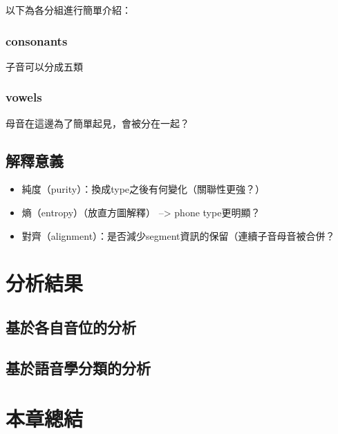 以下為各分組進行簡單介紹：

\subsubsection{consonants}

子音可以分成五類

\subsubsection{vowels}

母音在這邊為了簡單起見，會被分在一起？

\subsection{解釋意義}

\begin{itemize}
    \item 純度（purity）：換成type之後有何變化（關聯性更強？）
    \item 熵（entropy）（放直方圖解釋） --> phone type更明顯？
    \item 對齊（alignment）：是否減少segment資訊的保留（連續子音母音被合併？
\end{itemize}

\section{分析結果}

 
\subsection{基於各自音位的分析}
\subsection{基於語音學分類的分析}
\section{本章總結}

